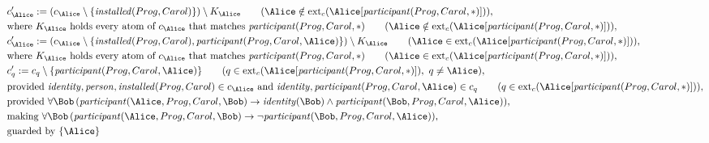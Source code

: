\begin{align*}
&
c'_
{
\Alice
}
 := 
(c_
{
\Alice
}
 \setminus 
\{
\mathit{\detokenize{
installed
}}
(
Prog
,
Carol
)
\}
) \setminus K_
{
\Alice
}
 \qquad (
\Alice
 \notin 
\mathrm{ext}_c(
\Alice
[
\mathit{\detokenize{
participant
}}
(
Prog
,
Carol
,
\ast
)
]
)
)
,\\
&
\text{where } K_
{
\Alice
}
 \text{ holds every atom of } c_
{
\Alice
}
 \text{ that matches } 
\mathit{\detokenize{
participant
}}
(
Prog
,
Carol
,
\ast
)
 \qquad (
\Alice
 \notin 
\mathrm{ext}_c(
\Alice
[
\mathit{\detokenize{
participant
}}
(
Prog
,
Carol
,
\ast
)
]
)
)
,\\
&
c'_
{
\Alice
}
 := 
(c_
{
\Alice
}
 \setminus 
\{
\mathit{\detokenize{
installed
}}
(
Prog
,
Carol
)
,
\mathit{\detokenize{
participant
}}
(
Prog
,
Carol
,
\Alice
)
\}
) \setminus K_
{
\Alice
}
 \qquad (
\Alice
 \in 
\mathrm{ext}_c(
\Alice
[
\mathit{\detokenize{
participant
}}
(
Prog
,
Carol
,
\ast
)
]
)
)
,\\
&
\text{where } K_
{
\Alice
}
 \text{ holds every atom of } c_
{
\Alice
}
 \text{ that matches } 
\mathit{\detokenize{
participant
}}
(
Prog
,
Carol
,
\ast
)
 \qquad (
\Alice
 \in 
\mathrm{ext}_c(
\Alice
[
\mathit{\detokenize{
participant
}}
(
Prog
,
Carol
,
\ast
)
]
)
)
,\\
&
c'_
q
 := 
c_
q
 \setminus 
\{
\mathit{\detokenize{
participant
}}
(
Prog
,
Carol
,
\Alice
)
\}
 \qquad (
q
 \in 
\mathrm{ext}_c(
\Alice
[
\mathit{\detokenize{
participant
}}
(
Prog
,
Carol
,
\ast
)
]
)
,\ 
q \neq 
\Alice
)
,\\
&
\text{provided } 
\mathit{\detokenize{
identity
}}
,
\mathit{\detokenize{
person
}}
,
\mathit{\detokenize{
installed
}}
(
Prog
,
Carol
)
 \in c_
{
\Alice
}
 \text{ and } 
\mathit{\detokenize{
identity
}}
,
\mathit{\detokenize{
participant
}}
(
Prog
,
Carol
,
\Alice
)
 \in c_
q
 \qquad (
q \in 
\mathrm{ext}_c(
\Alice
[
\mathit{\detokenize{
participant
}}
(
Prog
,
Carol
,
\ast
)
]
)
)
,\\
&
\text{provided } 
\forall 
\Bob
\,(
\mathit{\detokenize{
participant
}}
(
\Alice
,
Prog
,
Carol
,
\Bob
)
\rightarrow
\mathit{\detokenize{
identity
}}
(
\Bob
)
\land
\mathit{\detokenize{
participant
}}
(
\Bob
,
Prog
,
Carol
,
\Alice
)
)
,\\
&
\text{making } 
\forall 
\Bob
\,(
\mathit{\detokenize{
participant
}}
(
\Alice
,
Prog
,
Carol
,
\Bob
)
\rightarrow
\neg 
\mathit{\detokenize{
participant
}}
(
\Bob
,
Prog
,
Carol
,
\Alice
)
)
,\\
&
\text{guarded by } \{
\Alice
\}
\end{align*}
